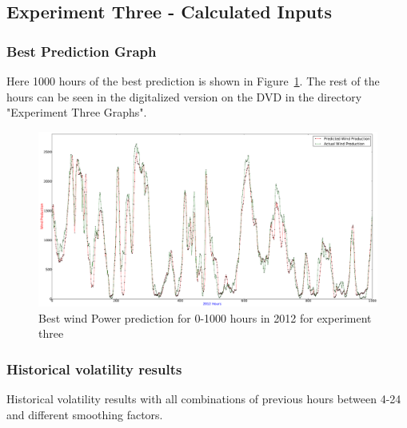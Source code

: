 \subsection{Experiment Three - Calculated Inputs}

\subsubsection{Best Prediction Graph}
Here 1000 hours of the best prediction is shown in Figure~\ref{fig:experimentThreeInput}. The rest of the hours can be seen in the digitalized version on the DVD in the directory "Experiment Three Graphs".

\begin{figure}
\centering
\includegraphics[width=0.99\linewidth]{billeder/experimentThreeInput.png}
\caption{Best wind Power prediction for 0-1000 hours in 2012 for experiment three}
\label{fig:experimentThreeInput}
\end{figure} 

\subsubsection{Historical volatility results}
\label{sec:historicalVolatiltiyResultsAppendix}
Historical volatility results with all combinations of previous hours between 4-24 and different smoothing factors.

